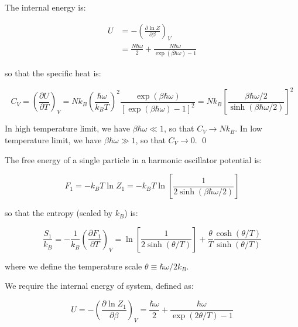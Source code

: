 \documentclass[12pt]{article}
\begin{document}
The internal energy is:

\begin{equation}
    \begin{split}
        U &= -\left( \frac{\partial \ln Z}{\partial \beta} \right)_{V} \\
        &= \frac{N \hbar \omega}{2} + \frac{N \hbar \omega}{\exp\left( \beta \hbar \omega \right) - 1}
    \end{split}
\end{equation}

so that the specific heat is:

\begin{equation}
    C_{V} = \left( \frac{\partial U}{\partial T} \right)_{V} = N k_{B} \left( \frac{\hbar \omega}{k_{B}T} \right)^{2} \frac{\exp\left( \beta \hbar \omega \right)}{\left[ \exp\left( \beta \hbar \omega \right) - 1 \right]^{2}} = N k_{B} \left[ \frac{\beta \hbar \omega/2}{\sinh\left( \beta \hbar \omega / 2 \right)} \right]^{2}
\end{equation}

In high temperature limit, we have $\beta \hbar \omega \ll 1$, so that $C_{V} \to N k_{B}$. In low temperature limit, we have $\beta \hbar \omega \gg 1$, so that $C_{V} \to 0$.
\qed


The free energy of a single particle in a harmonic oscillator potential is:

\begin{equation}
    F_{1} = -k_{B}T \ln{Z_{1}} = -k_{B}T \ln{\left[ \frac{1}{2 \sinh{\left( \beta \hbar \omega / 2 \right)}} \right]}
\end{equation}

so that the entropy (scaled by $k_{B}$) is:

\begin{equation}
    \frac{S_{1}}{k_{B}} = -\frac{1}{k_{B}} \left( \frac{\partial F_{1}}{\partial T} \right)_{V} = \ln{\left[ \frac{1}{2 \sinh{\left( \theta / T \right)}} \right]} + \frac{\theta}{T} \frac{\cosh{\left( \theta / T \right)}}{\sinh{\left( \theta / T \right)}}
\end{equation}

where we define the temperature scale $\theta \equiv \hbar \omega / 2k_{B}$.

We require the internal energy of system, defined as:

\begin{equation}
    U = -\left( \frac{\partial \ln{Z_{1}}}{\partial \beta} \right)_{V} = \frac{\hbar \omega}{2} + \frac{\hbar \omega}{\exp\left( 2\theta / T \right) - 1}
\end{equation}
\end{document}
